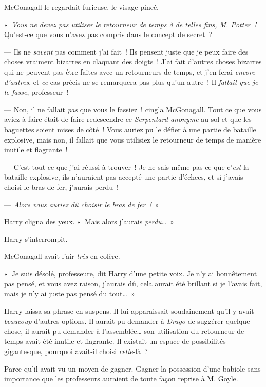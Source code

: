 McGonagall le regardait furieuse, le visage pincé.

«~\emph{Vous ne devez pas utiliser le retourneur de temps à de telles fins, M. Potter~!}
Qu'est-ce que vous n'avez pas compris dans le concept de secret~?

--- Ils ne \emph{savent} pas comment j'ai fait~!
Ils pensent juste que je peux faire des choses vraiment bizarres en claquant des doigts~!
J'ai fait d'autres choses bizarres qui ne peuvent pas être faites avec un retourneurs de temps, et j'en ferai \emph{encore d'autres}, et \emph{ce} cas précis ne se remarquera pas plus qu'un autre~!
Il \emph{fallait que je le fasse}, professeur~!

--- Non, il ne fallait \emph{pas} que vous le fassiez~! cingla McGonagall.
Tout ce que vous aviez à faire était de faire redescendre ce \emph{Serpentard anonyme} au sol et que les baguettes soient mises de côté~!
Vous auriez pu le défier à une partie de bataille explosive, mais non, il fallait que vous utilisiez le retourneur de temps de manière inutile et flagrante~!

--- C'est tout ce que j'ai réussi à trouver~!
Je ne sais même pas ce que c'\emph{est} la bataille explosive, ils n'auraient pas accepté une partie d'échecs, et si j'avais choisi le bras de fer, j'aurais perdu~!

--- \emph{Alors vous auriez dû choisir le bras de fer~!}~»

Harry cligna des yeux.
«~Mais alors j'aurais \emph{perdu}…~»

Harry s'interrompit.

McGonagall avait l'air \emph{très} en colère.

«~Je suis désolé, professeure, dit Harry d'une petite voix.
Je n'y ai honnêtement pas pensé, et vous avez raison, j'aurais dû, cela aurait été brillant si je l'avais fait, mais je n'y ai juste pas pensé du tout…~»

Harry laissa sa phrase en suspens.
Il lui apparaissait soudainement qu'il y avait \emph{beaucoup} d'autres options.
Il aurait pu demander à \emph{Drago} de suggérer quelque chose, il aurait pu demander à l'assemblée… son utilisation du retourneur de temps avait été inutile et flagrante.
Il existait un espace de possibilités gigantesque, pourquoi avait-il choisi \emph{celle}-là~?

Parce qu'il avait vu un moyen de gagner.
Gagner la possession d'une babiole sans importance que les professeurs auraient de toute façon reprise à M. Goyle.

